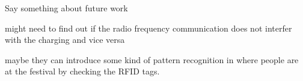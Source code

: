 Say something about future work

might need to find out if the radio frequency communication does not interfer with the charging and vice versa

maybe they can introduce some kind of pattern recognition in where people are at the festival by checking the RFID tags. 